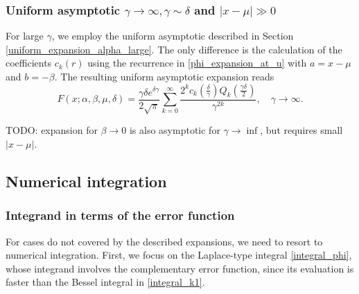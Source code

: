 \documentclass[10pt,a4paper,oneside]{article}
\numberwithin{equation}{section}
\begin{document}
\subsubsection{Uniform asymptotic $\gamma \to \infty, \gamma \sim \delta$ and $|x-\mu| \gg 0$}
For large $\gamma$, we employ the uniform asymptotic described in Section \ref{uniform_expansion_alpha_large}. The only difference is the calculation of the coefficients $c_k(r)$ using the recurrence in \eqref{phi_expansion_at_u} with $a = x-\mu$ and $b = -\beta$. The resulting uniform asymptotic expansion reads
\begin{equation}
F(x; \alpha, \beta, \mu, \delta) = \frac{\gamma \delta e^{\delta \gamma}}{2\sqrt{\pi}} \sum_{k=0}^{\infty} \frac{2^k c_k\left(\frac{\delta}{\gamma}\right) Q_k\left(\frac{\gamma\delta}{2}\right)}{\gamma^{2k}}, \quad \gamma \to \infty.
\end{equation}


TODO: expansion for $\beta \to 0$ is also asymptotic for $\gamma \to \inf$, but requires small $|x-\mu|$.

\subsection{Numerical integration}\label{section_numerical_integration}
\subsubsection{Integrand in terms of the error function}

For cases do not covered by the described expansions, we need to resort to numerical integration. First, we focus on the Laplace-type integral \eqref{integral_phi}, whose integrand involves the complementary error function, since its evaluation is faster than the Bessel integral in \eqref{integral_k1}.
\end{document}
